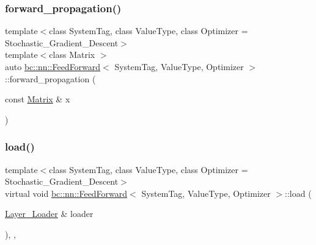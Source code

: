 \mbox{\label{structbc_1_1nn_1_1FeedForward_a8606a0a356a01693127e34ab3483b5d1}} 
\subsubsection{\texorpdfstring{forward\+\_\+propagation()}{forward\_propagation()}}
{\footnotesize\ttfamily template$<$class System\+Tag, class Value\+Type, class Optimizer = Stochastic\+\_\+\+Gradient\+\_\+\+Descent$>$ \\
template$<$class Matrix $>$ \\
auto \hyperlink{structbc_1_1nn_1_1FeedForward}{bc\+::nn\+::\+Feed\+Forward}$<$ System\+Tag, Value\+Type, Optimizer $>$\+::forward\+\_\+propagation (\begin{DoxyParamCaption}\item[{const \hyperlink{namespacebc_a92dd1e243183b382432a5fac3ed8b89f}{Matrix} \&}]{x }\end{DoxyParamCaption})\hspace{0.3cm}{\ttfamily [inline]}}

\mbox{\label{structbc_1_1nn_1_1FeedForward_a8fccd9e87dda10e01e74732ad8c71f3d}} 
\subsubsection{\texorpdfstring{load()}{load()}}
{\footnotesize\ttfamily template$<$class System\+Tag, class Value\+Type, class Optimizer = Stochastic\+\_\+\+Gradient\+\_\+\+Descent$>$ \\
virtual void \hyperlink{structbc_1_1nn_1_1FeedForward}{bc\+::nn\+::\+Feed\+Forward}$<$ System\+Tag, Value\+Type, Optimizer $>$\+::load (\begin{DoxyParamCaption}\item[{\hyperlink{structbc_1_1nn_1_1Layer__Loader}{Layer\+\_\+\+Loader} \&}]{loader }\end{DoxyParamCaption})\hspace{0.3cm}{\ttfamily [inline]}, {\ttfamily [override]}, {\ttfamily [virtual]}}



